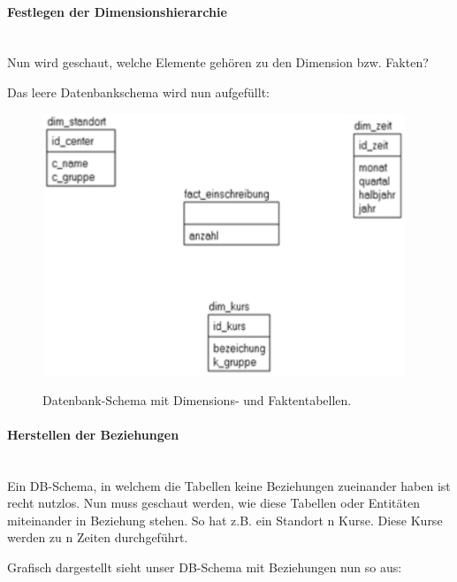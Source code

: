 \documentclass[a4paper, 11pt, nofootinbib]{article}
\begin{document}
\newpage

\paragraph{Festlegen der Dimensionshierarchie}\mbox{}\\
Nun wird geschaut, welche Elemente gehören zu den Dimension bzw. Fakten?

Das leere Datenbankschema wird nun aufgefüllt:

\begin{figure}[htb]
	\centering
	\includegraphics[keepaspectratio=true,height=8\baselineskip]{db-schema.jpg}
	\caption{Datenbank-Schema mit Dimensions- und Faktentabellen.}
	\label{fig:db-schema}
\end{figure}

\paragraph{Herstellen der Beziehungen}\mbox{}\\
Ein DB-Schema, in welchem die Tabellen keine Beziehungen zueinander haben ist recht nutzlos. Nun muss geschaut werden, wie diese Tabellen oder Entitäten miteinander in Beziehung stehen. So hat z.B. ein Standort n Kurse. Diese Kurse werden zu n Zeiten durchgeführt. 

Grafisch dargestellt sieht unser DB-Schema mit Beziehungen nun so aus:
\end{document}
